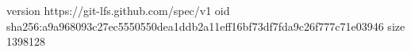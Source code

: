 version https://git-lfs.github.com/spec/v1
oid sha256:a9a968093c27ec5550550dea1ddb2a11eff16bf73df7fda9c26f777c71e03946
size 1398128
